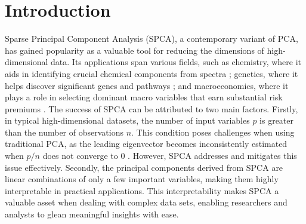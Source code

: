 \documentclass[pdftex, noinfoline, letter]{imsart}
\theoremstyle{plain}
\begin{document}
\begin{frontmatter}
\begin{keyword}
\end{keyword}

\end{frontmatter}


\section{Introduction}
\label{sec:intro}

Sparse Principal Component Analysis (SPCA), a contemporary variant of PCA, has gained popularity as a valuable tool for reducing the dimensions of high-dimensional data. Its applications span various fields, such as chemistry, where it aids in identifying crucial chemical components from spectra \citep{varmuza09}; genetics, where it helps discover significant genes and pathways \citep{li17}; and macroeconomics, where it plays a role in selecting dominant macro variables that earn substantial risk premiums \citep{rapach19}. The success of SPCA can be attributed to two main factors. Firstly, in typical high-dimensional datasets, the number of input variables $p$ is greater than the number of observations $n$. This condition poses challenges when using traditional PCA, as the leading eigenvector becomes inconsistently estimated when $p/n$ does not converge to 0 \citep{paul07, johnstone09}. However, SPCA addresses and mitigates this issue effectively. Secondly, the principal components derived from SPCA are linear combinations of only a few important variables, making them highly interpretable in practical applications. This interpretability makes SPCA a valuable asset when dealing with complex data sets, enabling researchers and analysts to glean meaningful insights with ease.
\end{document}
